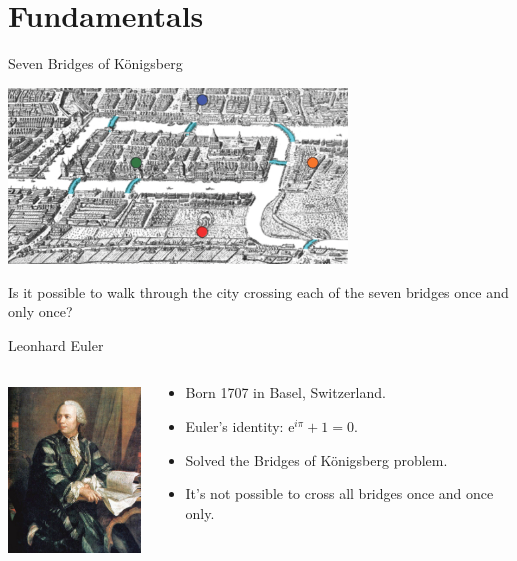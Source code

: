 

\section{Fundamentals}

\begin{frame}{Seven Bridges of K{\"o}nigsberg}
	\begin{center}
		\includegraphics[width=9cm]{img/konigsberg.png}
	\end{center}
	Is it possible to walk through the city crossing each of the seven bridges once and only once?
\end{frame}

\begin{frame}{Leonhard Euler}
  \begin{columns}
    \begin{column}{0.25\textwidth}
      \includegraphics[height=1.8in]{img/euler.jpg}
    \end{column}
    \begin{column}{0.6\textwidth}
      \begin{itemize}
    	 \item Born 1707 in Basel, Switzerland.
        \vspace{0.25cm}
    	 \item Euler's identity: $\mathrm{e}^{i \pi} + 1 = 0$.
        \vspace{0.25cm}
    	 \item Solved the Bridges of K{\"o}nigsberg problem.
        \vspace{0.25cm}
        \item It's not possible to cross all bridges once and once only.
      \end{itemize}
    \end{column}
  \end{columns}
\end{frame}

